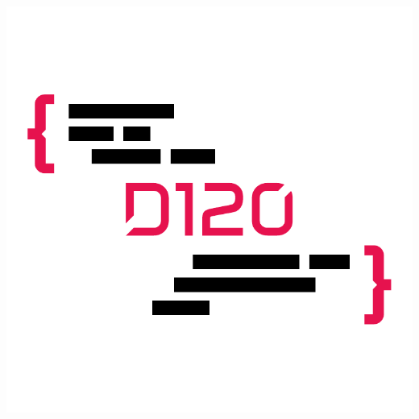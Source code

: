 \begin{frame}
\begin{columns}[T]
\begin{column}{.4\textwidth}
{            }{
                \includegraphics[width=\textwidth,height=\textheight,keepaspectratio]{../globalMedia/logo.pdf}
            }
            \vfill
        \end{column}
    \end{columns}
\end{frame}

